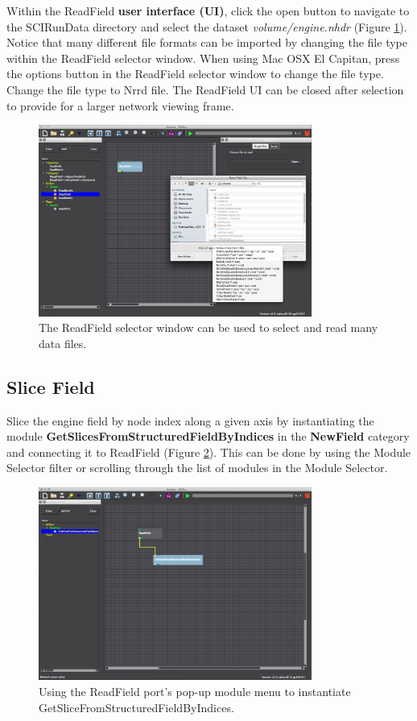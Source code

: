 \documentclass[fleqn,11pt,openany]{book}
\begin{document}
Within the ReadField \textbf{user interface (UI)}, click the open button to navigate to the SCIRunData directory and select the dataset \emph{volume/engine.nhdr} (Figure \ref{fig:readfieldtype}). Notice that many different file formats can be imported by changing the file type within the ReadField selector window. When using Mac OSX El Capitan, press the options button in the ReadField selector window to change the file type. Change the file type to Nrrd file. The ReadField UI can be closed after selection to provide for a larger network viewing frame. 

\begin{figure}[H]
\center
\includegraphics[width=0.8\textwidth]{BasicTutorial_figures/readfield_select.png}
\caption{The ReadField selector window can be used to select and read many data files.}
\label{fig:readfieldtype}
\end{figure}

\subsection{Slice Field}\label{slice}

Slice the engine field by node index along a given axis by instantiating the module
\textbf{GetSlicesFromStructuredFieldByIndices} in the \textbf{NewField} category and connecting it to ReadField (Figure \ref{fig:slicemod}). This can be done by using the Module Selector filter or scrolling through the list of modules in the Module Selector.

\begin{figure}[H]
\center
\includegraphics[width=0.8\textwidth]{BasicTutorial_figures/getslice.png}
\caption{Using the ReadField port's pop-up module menu to instantiate GetSliceFromStructuredFieldByIndices.}
\label{fig:slicemod}
\end{figure}
\end{document}

